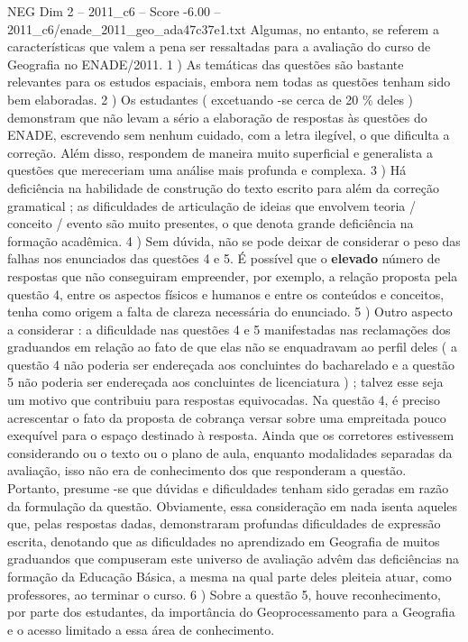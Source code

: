 \begin{textsample}{NEG Dim 2 – 2011\_c6 – Score -6.00 – 2011\_c6/enade\_2011\_geo\_ada47c37e1.txt}
Algumas, no entanto, se referem a características que valem a pena ser ressaltadas para a avaliação do curso de Geografia no ENADE/2011. 1 ) As temáticas das questões são bastante relevantes para os estudos espaciais, embora nem todas as questões tenham sido bem elaboradas. 2 ) Os estudantes ( excetuando -se cerca de 20 \% deles ) demonstram que não levam a sério a elaboração de respostas às questões do ENADE, escrevendo sem nenhum cuidado, com a letra ilegível, o que dificulta a correção.
Além disso, respondem de maneira muito superficial e generalista a questões que mereceriam uma análise mais profunda e complexa. 3 ) Há deficiência na habilidade de construção do texto escrito para além da correção gramatical ; as dificuldades de articulação de ideias que envolvem teoria / conceito / evento são muito presentes, o que denota grande deficiência na formação acadêmica. 4 ) Sem dúvida, não se pode deixar de considerar o peso das falhas nos enunciados das questões 4 e 5.
É possível que o \textbf{elevado} número de respostas que não conseguiram empreender, por exemplo, a relação proposta pela questão 4, entre os aspectos físicos e humanos e entre os conteúdos e conceitos, tenha como origem a falta de clareza necessária do enunciado. 5 ) Outro aspecto a considerar : a dificuldade nas questões 4 e 5 manifestadas nas reclamações dos graduandos em relação ao fato de que elas não se enquadravam ao perfil deles ( a questão 4 não poderia ser endereçada aos concluintes do bacharelado e a questão 5 não poderia ser endereçada aos concluintes de licenciatura ) ; talvez esse seja um motivo que contribuiu para respostas equivocadas.
Na questão 4, é preciso acrescentar o fato da proposta de cobrança versar sobre uma empreitada pouco exequível para o espaço destinado à resposta.
Ainda que os corretores estivessem considerando ou o texto ou o plano de aula, enquanto modalidades separadas da avaliação, isso não era de conhecimento dos que responderam a questão.
Portanto, presume -se que dúvidas e dificuldades tenham sido geradas em razão da formulação da questão.
Obviamente, essa consideração em nada isenta aqueles que, pelas respostas dadas, demonstraram profundas dificuldades de expressão escrita, denotando que as dificuldades no aprendizado em Geografia de muitos graduandos que compuseram este universo de avaliação advêm das deficiências na formação da Educação Básica, a mesma na qual parte deles pleiteia atuar, como professores, ao terminar o curso. 6 ) Sobre a questão 5, houve reconhecimento, por parte dos estudantes, da importância do Geoprocessamento para a Geografia e o acesso limitado a essa área de conhecimento.

\end{textsample}
